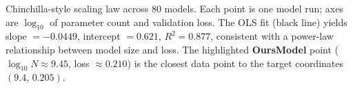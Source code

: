 \caption{Chinchilla-style scaling law across 80 models. Each point is one model run; axes are $\log_{10}$ of parameter count and validation loss. The OLS fit (black line) yields slope $= -0.0449$, intercept $= 0.621$, $R^2 = 0.877$, consistent with a power-law relationship between model size and loss. The highlighted \textbf{OursModel} point ($\log_{10}N \approx 9.45$, loss $\approx 0.210$) is the closest data point to the target coordinates $(9.4,\,0.205)$.}
